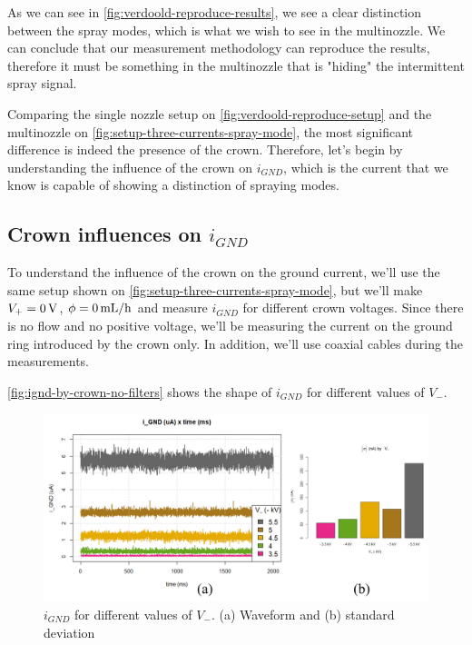 \documentclass[oneside,12pt]{article}
\begin{document}
As we can see in \autoref{fig:verdoold-reproduce-results}, we see a clear distinction between the spray modes, 
which is what we wish to see in the multinozzle. We can conclude that our measurement methodology can 
reproduce the results, therefore it must be something in the multinozzle that is "hiding" the intermittent spray 
signal.

Comparing the single nozzle setup on \autoref{fig:verdoold-reproduce-setup} and the multinozzle on \autoref{fig:setup-three-currents-spray-mode}, 
the most significant difference is indeed the presence of the crown. Therefore, let's begin by understanding the influence 
of the crown on $i_{GND}$, which is the current that we know is capable of showing a distinction of spraying 
modes. 

\subsection{Crown influences on $i_{GND}$}

To understand the influence of the crown on the ground current, we'll use the same setup shown on 
\autoref{fig:setup-three-currents-spray-mode}, but we'll make $V_+ = 0 \,\mathrm{V}$, $\phi = 0 \,\mathrm{mL / h}$ and measure $i_{GND}$ for different
crown voltages. Since there is no flow 
and no positive voltage, we'll be measuring the current on the ground ring introduced by the crown only.
In addition, we'll use coaxial cables during the measurements.

\autoref{fig:ignd-by-crown-no-filters} shows the shape of $i_{GND}$ for different values of $V_-$.

\begin{figure}[h!]
    \centering
    \includegraphics[width=1\textwidth,trim=1 1 1 1,clip]{figures/ignd-by-crown-no-filters.png}
    \caption{$i_{GND}$ for different values of $V_-$. (a) Waveform and (b) standard deviation}
    \label{fig:ignd-by-crown-no-filters}
\end{figure}
\end{document}
